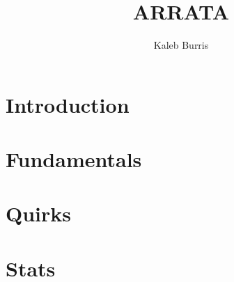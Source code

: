 \documentclass{book}
\title{ARRATA}
\author{Kaleb Burris}
\date{}
\begin{document}
    \maketitle

    \tableofcontents

    \chapter{Introduction}
    

    \chapter{Fundamentals}

    \chapter{Quirks}

    \chapter{Stats}
\end{document}
